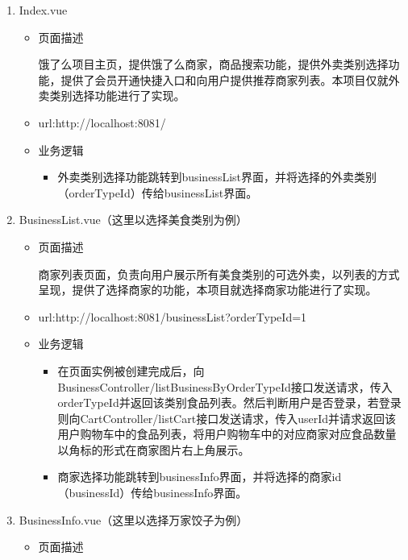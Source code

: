 \begin{enumerate}
  \item Index.vue
  \begin{itemize}
    \item 页面描述
    
    饿了么项目主页，提供饿了么商家，商品搜索功能，提供外卖类别选择功能，提供了会员开通快捷入口和向用户提供推荐商家列表。本项目仅就外卖类别选择功能进行了实现。

    \item url:http://localhost:8081/
    
    \item 业务逻辑
    \begin{itemize}
      \item 外卖类别选择功能跳转到businessList界面，并将选择的外卖类别（orderTypeId）传给businessList界面。
    \end{itemize}
  \end{itemize}

  \item BusinessList.vue（这里以选择美食类别为例）
  \begin{itemize}
    \item 页面描述
    
    商家列表页面，负责向用户展示所有美食类别的可选外卖，以列表的方式呈现，提供了选择商家的功能，本项目就选择商家功能进行了实现。

    \item url:http://localhost:8081/businessList?orderTypeId=1
    
    \item 业务逻辑
    \begin{itemize}
      \item 在页面实例被创建完成后，向BusinessController/listBusinessByOrderTypeId接口发送请求，传入orderTypeId并返回该类别食品列表。然后判断用户是否登录，若登录则向CartController/listCart接口发送请求，传入userId并请求返回该用户购物车中的食品列表，将用户购物车中的对应商家对应食品数量以角标的形式在商家图片右上角展示。
      
      \item 商家选择功能跳转到businessInfo界面，并将选择的商家id（businessId）传给businessInfo界面。
    \end{itemize}
    
  \end{itemize}

  \item BusinessInfo.vue（这里以选择万家饺子为例）
  \begin{itemize}
    \item 页面描述
    

\end{itemize}
\end{enumerate}
